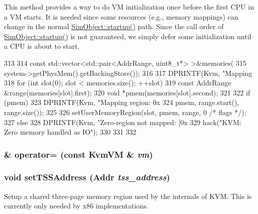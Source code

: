 This method provides a way to do VM initialization once before the first CPU in a VM starts. It is needed since some resources (e.g., memory mappings) can change in the normal \hyperlink{classSimObject_aecc7d8debf54990ffeaaed5bac7d7d81}{SimObject::startup()} path. Since the call order of \hyperlink{classSimObject_aecc7d8debf54990ffeaaed5bac7d7d81}{SimObject::startup()} is not guaranteed, we simply defer some initialization until a CPU is about to start. 


\begin{DoxyCode}
313 {
314     const std::vector<std::pair<AddrRange, uint8_t*> >&memories(
315         system->getPhysMem().getBackingStore());
316 
317     DPRINTF(Kvm, "Mapping %
318     for (int slot(0); slot < memories.size(); ++slot) {
319         const AddrRange &range(memories[slot].first);
320         void *pmem(memories[slot].second);
321 
322         if (pmem) {
323             DPRINTF(Kvm, "Mapping region: 0x%
324                     pmem, range.start(), range.size());
325 
326             setUserMemoryRegion(slot, pmem, range, 0 /* flags */);
327         } else {
328             DPRINTF(Kvm, "Zero-region not mapped: [0x%
329             hack("KVM: Zero memory handled as IO\n");
330         }
331     }
332 }
\end{DoxyCode}
\hypertarget{classKvmVM_a4618bd58dd0f40bb2ab57327f7223310}{
\subsubsection[{operator=}]{\& operator= (const {\bf KvmVM} \& {\em vm})}}
\label{classKvmVM_a4618bd58dd0f40bb2ab57327f7223310}
\hypertarget{classKvmVM_a04e3bed0038549a704fe5c04015ce46d}{
\subsubsection[{setTSSAddress}]{\setlength{\rightskip}{0pt plus 5cm}void setTSSAddress ({\bf Addr} {\em tss\_\-address})}}
\label{classKvmVM_a04e3bed0038549a704fe5c04015ce46d}
Setup a shared three-\/page memory region used by the internals of KVM. This is currently only needed by x86 implementations.


